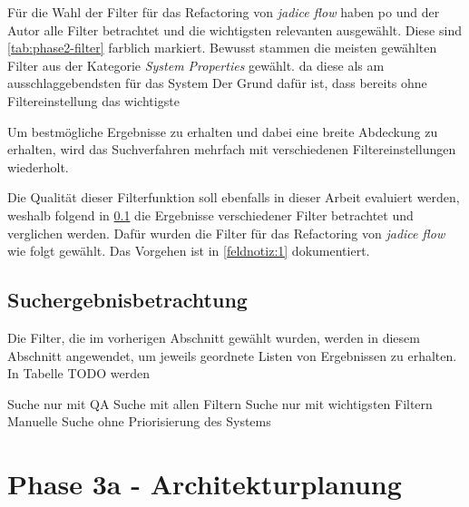 Für die Wahl der Filter für das Refactoring von \emph{jadice flow} haben \gls{po} und der Autor alle Filter betrachtet und die wichtigsten relevanten ausgewählt.
Diese sind \cref{tab:phase2-filter} farblich markiert.
Bewusst stammen die meisten gewählten Filter aus der Kategorie \emph{System Properties} gewählt. da diese als am ausschlaggebendsten für das System 
Der Grund dafür ist, dass bereits ohne Filtereinstellung das wichtigste 

Um bestmögliche Ergebnisse zu erhalten und dabei eine breite Abdeckung zu erhalten, wird das Suchverfahren mehrfach mit verschiedenen Filtereinstellungen wiederholt.






Die Qualität dieser Filterfunktion soll ebenfalls in dieser Arbeit evaluiert werden, weshalb folgend in \cref{sec:phase2-ergebnisdurchsicht} die Ergebnisse verschiedener Filter betrachtet und verglichen werden.
Dafür wurden die Filter für das Refactoring von \emph{jadice flow} wie folgt gewählt.
Das Vorgehen ist in \cref{feldnotiz:1} dokumentiert.

\subsection{Suchergebnisbetrachtung}
\label{sec:phase2-ergebnisdurchsicht}

Die Filter, die im vorherigen Abschnitt gewählt wurden, werden in diesem Abschnitt angewendet, um jeweils geordnete Listen von Ergebnissen zu erhalten.
In Tabelle TODO werden



Suche nur mit QA
Suche mit allen Filtern
Suche nur mit wichtigsten Filtern
Manuelle Suche ohne Priorisierung des Systems

\section{Phase 3a - Architekturplanung}
\label{sec:durchführung-phase3}